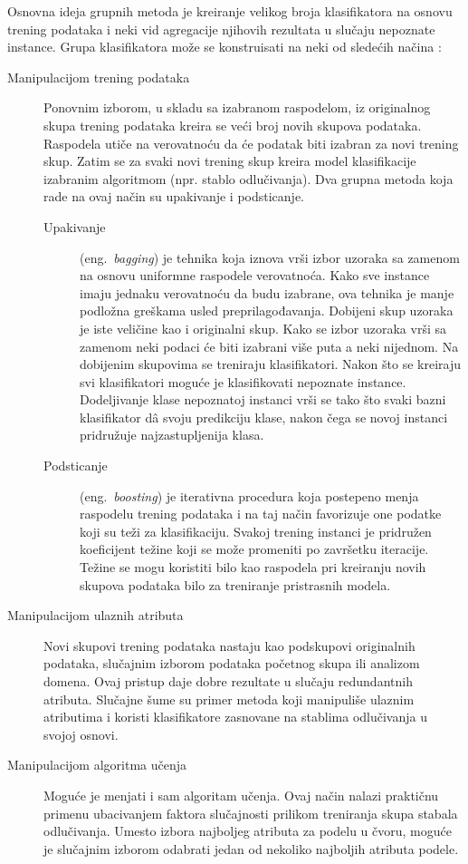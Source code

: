 \documentclass[12pt,oneside]{memoir}
\begin{document}
Osnovna ideja grupnih metoda je kreiranje velikog broja klasifikatora na osnovu trening podataka i neki vid agregacije njihovih rezultata u slučaju nepoznate instance. Grupa klasifikatora može se konstruisati na neki od sledećih načina \cite{mitic}:
\begin{description}
\item[Manipulacijom trening podataka] Ponovnim izborom, u skladu sa izabranom raspodelom, iz originalnog skupa trening podataka kreira se veći broj novih skupova podataka. Raspodela utiče na verovatnoću da će podatak biti izabran za novi trening skup. Zatim se za svaki novi trening skup kreira model klasifikacije izabranim algoritmom (npr. stablo odlučivanja). Dva grupna metoda koja rade na ovaj način su upakivanje i podsticanje.
\begin{description}
\item[Upakivanje] (eng.~\textit{bagging}) je tehnika koja iznova vrši izbor uzoraka sa zamenom na osnovu uniformne raspodele verovatnoća. Kako sve instance imaju jednaku verovatnoću da budu izabrane, ova tehnika je manje podložna greškama usled preprilagođavanja. Dobijeni skup uzoraka je iste veličine kao i originalni skup. Kako se izbor uzoraka vrši sa zamenom neki podaci će biti izabrani više puta a neki nijednom. Na dobijenim skupovima se treniraju klasifikatori. Nakon što se kreiraju svi klasifikatori moguće je klasifikovati nepoznate instance. Dodeljivanje klase nepoznatoj instanci vrši se tako što svaki bazni klasifikator d\^a svoju predikciju klase, nakon čega se novoj instanci pridružuje najzastupljenija klasa.
\item[Podsticanje] (eng.~\textit{boosting}) je iterativna procedura koja postepeno menja raspodelu trening podataka i na taj način favorizuje one podatke koji su teži za klasifikaciju. Svakoj trening instanci je pridružen koeficijent težine koji se može promeniti po završetku iteracije. Težine se mogu koristiti bilo kao raspodela pri kreiranju novih skupova podataka bilo za treniranje pristrasnih modela.
\end{description}
\item[Manipulacijom ulaznih atributa] Novi skupovi trening podataka nastaju kao podskupovi originalnih podataka, slučajnim izborom podataka početnog skupa ili analizom domena. Ovaj pristup daje dobre rezultate u slučaju redundantnih atributa. Slučajne šume su primer metoda koji manipuliše ulaznim atributima i koristi klasifikatore zasnovane na stablima odlučivanja u svojoj osnovi. 
\item[Manipulacijom algoritma učenja] Moguće je menjati i sam algoritam učenja. Ovaj način nalazi praktičnu primenu ubacivanjem faktora slučajnosti prilikom treniranja skupa stabala odlučivanja. Umesto izbora najboljeg atributa za podelu u čvoru, moguće je slučajnim izborom odabrati jedan od nekoliko najboljih atributa podele.

\end{description}
\end{document}
